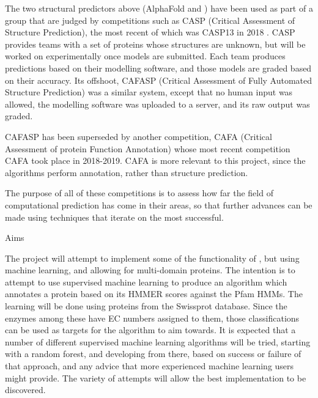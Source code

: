 \documentclass[12pt]{article}
\makeatletter
\renewcommand\subsection{\@startsection{subsection}{4}{\z@}
            {-2.5ex\@plus -1ex \@minus -.25ex}
            {1ex \@plus .25ex}
            {\normalfont\Large\bfseries}}
\makeatother
\begin{document}
			The two structural predictors above (AlphaFold and \cite{RefWorks:doc:5d89ec21e4b02d8374a7bbe7}) have been used as part of a group that are judged by competitions such as CASP (Critical Assessment of Structure Prediction), the most recent of which was CASP13 in 2018 \citep{RefWorks:doc:5d822fa4e4b0fa10423c5184}.  CASP provides teams with a set of proteins whose structures are unknown, but will be worked on experimentally once models are submitted.  Each team produces predictions based on their modelling software, and those models are graded based on their accuracy.  Its offshoot, CAFASP (Critical Assessment of Fully Automated Structure Prediction) was a similar system, except that no human input was allowed, the modelling software was uploaded to a server, and its raw output was graded.  
		
			CAFASP has been superseded by another competition, CAFA (Critical Assessment of protein Function Annotation) \citep{RefWorks:doc:5d82345ae4b09beeb95d60bb} whose most recent competition CAFA took place in 2018-2019.  CAFA is more relevant to this project, since the algorithms perform annotation, rather than structure prediction.  
		
			The purpose of all of these competitions is to assess how far the field of computational prediction has come in their areas, so that further advances can be made using techniques that iterate on the most successful.
			
		\subsection{Aims}
		
			The project will attempt to implement some of the functionality of \cite{RefWorks:doc:5d88bf0fe4b037ddf3555c0b}, but using machine learning, and allowing for multi-domain proteins.  The intention is to attempt to use supervised machine learning to produce an algorithm which annotates a protein based on its HMMER scores against the Pfam HMMs.  The learning will be done using proteins from the Swissprot database.  Since the enzymes among these have EC numbers assigned to them, those classifications can be used as targets for the algorithm to aim towards.  It is expected that a number of different supervised machine learning algorithms will be tried, starting with a random forest, and developing from there, based on success or failure of that approach, and any advice that more experienced machine learning users might provide.  The variety of attempts will allow the best implementation to be discovered. 
		
\end{document}
